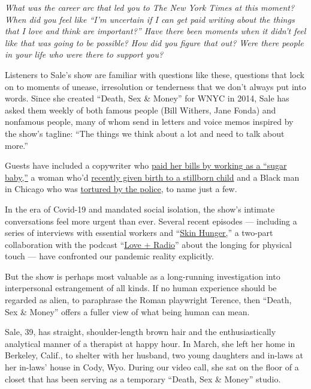 \emph{What was the career arc that led you to The New York Times at this
moment? When did you feel like ``I'm uncertain if I can get paid writing
about the things that I love and think are important?'' Have there been
moments when it didn't feel like that was going to be possible? How did
you figure that out? Were there people in your life who were there to
support you?}

Listeners to Sale's show are familiar with questions like these,
questions that lock on to moments of unease, irresolution or tenderness
that we don't always put into words. Since she created ``Death, Sex \&
Money'' for WNYC in 2014, Sale has asked them weekly of both famous
people (Bill Withers, Jane Fonda) and nonfamous people, many of whom
send in letters and voice memos inspired by the show's tagline: ``The
things we think about a lot and need to talk about more.''

Guests have included a copywriter who
\href{https://www.wnycstudios.org/podcasts/deathsexmoney/episodes/seeking-arrangement-sugar-daddy-death-sex-money}{paid
her bills by working as a ``sugar baby,''} a woman who'd
\href{https://www.wnycstudios.org/podcasts/deathsexmoney/episodes/stillbirth-death-sex-money}{recently
given birth to a stillborn child} and a Black man in Chicago who was
\href{https://www.wnycstudios.org/podcasts/deathsexmoney/episodes/darrell-cannon-2020-death-sex-money}{tortured
by the police}, to name just a few.

In the era of Covid-19 and mandated social isolation, the show's
intimate conversations feel more urgent than ever. Several recent
episodes --- including a series of interviews with essential workers and
``\href{https://www.wnycstudios.org/podcasts/deathsexmoney/episodes/skin-hunger-love-radio-part-1}{Skin
Hunger,}'' a two-part collaboration with the podcast
``\href{https://loveandradio.org/}{Love + Radio}'' about the longing for
physical touch --- have confronted our pandemic reality explicitly.

But the show is perhaps most valuable as a long-running investigation
into interpersonal estrangement of all kinds. If no human experience
should be regarded as alien, to paraphrase the Roman playwright Terence,
then ``Death, Sex \& Money'' offers a fuller view of what being human
can mean.

Sale, 39, has straight, shoulder-length brown hair and the
enthusiastically analytical manner of a therapist at happy hour. In
March, she left her home in Berkeley, Calif., to shelter with her
husband, two young daughters and in-laws at her in-laws' house in Cody,
Wyo. During our video call, she sat on the floor of a closet that has
been serving as a temporary ``Death, Sex \& Money'' studio.

